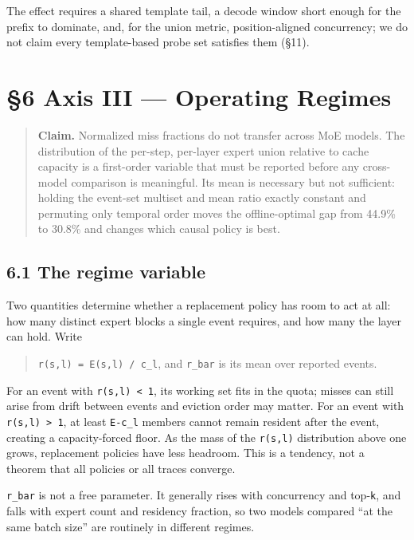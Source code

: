 \documentclass[
  10pt,
  letterpaper,
  10pt]{article}
\begin{document}
The effect requires a shared template tail, a decode window short enough
for the prefix to dominate, and, for the union metric, position-aligned
concurrency; we do not claim every template-based probe set satisfies
them (§11).

\section{§6 Axis III --- Operating
Regimes}\label{axis-iii-operating-regimes}

\begin{quote}
\textbf{Claim.} Normalized miss fractions do not transfer across MoE
models. The distribution of the per-step, per-layer expert union
relative to cache capacity is a first-order variable that must be
reported before any cross-model comparison is meaningful. Its mean is
necessary but not sufficient: holding the event-set multiset and mean
ratio exactly constant and permuting only temporal order moves the
offline-optimal gap from 44.9\% to 30.8\% and changes which causal
policy is best.
\end{quote}

\subsection{6.1 The regime variable}\label{the-regime-variable}

Two quantities determine whether a replacement policy has room to act at
all: how many distinct expert blocks a single event requires, and how
many the layer can hold. Write

\begin{quote}
\texttt{r(s,l)\ =\ \textbar{}E(s,l)\textbar{}\ /\ c\_l}, and
\texttt{r\_bar} is its mean over reported events.
\end{quote}

For an event with \texttt{r(s,l)\ \textless{}\ 1}, its working set fits
in the quota; misses can still arise from drift between events and
eviction order may matter. For an event with
\texttt{r(s,l)\ \textgreater{}\ 1}, at least
\texttt{\textbar{}E\textbar{}-c\_l} members cannot remain resident after
the event, creating a capacity-forced floor. As the mass of the
\texttt{r(s,l)} distribution above one grows, replacement policies have
less headroom. This is a tendency, not a theorem that all policies or
all traces converge.

\texttt{r\_bar} is not a free parameter. It generally rises with
concurrency and top-\texttt{k}, and falls with expert count and
residency fraction, so two models compared ``at the same batch size''
are routinely in different regimes.
\end{document}
